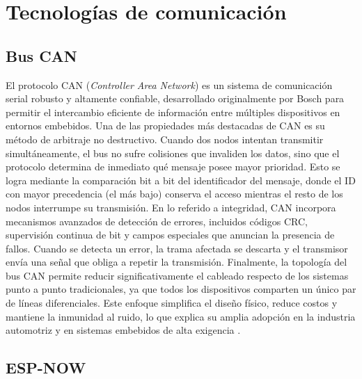 \section{Tecnologías de comunicación}
\subsection{Bus CAN}

El protocolo CAN (\textit{Controller Area Network}) es un sistema de comunicación serial robusto y altamente confiable, desarrollado originalmente por Bosch para permitir el intercambio eficiente de información entre múltiples dispositivos en entornos embebidos.
Una de las propiedades más destacadas de CAN es su método de arbitraje no destructivo. Cuando dos nodos intentan transmitir simultáneamente, el bus no sufre colisiones que invaliden los datos, sino que el protocolo determina de inmediato qué mensaje posee mayor prioridad. Esto se logra mediante la comparación bit a bit del identificador del mensaje, donde el ID con mayor precedencia (el más bajo) conserva el acceso mientras el resto de los nodos interrumpe su transmisión.
En lo referido a integridad, CAN incorpora mecanismos avanzados de detección de errores, incluidos códigos CRC, supervisión continua de bit y campos especiales que anuncian la presencia de fallos. Cuando se detecta un error, la trama afectada se descarta y el transmisor envía una señal que obliga a repetir la transmisión.
Finalmente, la topología del bus CAN permite reducir significativamente el cableado respecto de los sistemas punto a punto tradicionales, ya que todos los dispositivos comparten un único par de líneas diferenciales. Este enfoque simplifica el diseño físico, reduce costos y mantiene la inmunidad al ruido, lo que explica su amplia adopción en la industria automotriz y en sistemas embebidos de alta exigencia \cite{niCANoverview}.


\subsection{ESP-NOW}

